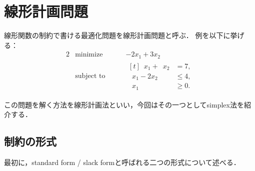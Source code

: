 \documentclass{jsarticle}
\begin{document}
\section{線形計画問題}

線形関数の制約で書ける最適化問題を線形計画問題と呼ぶ．
例を以下に挙げる：
\begin{alignat*}{2}
  & \text{minimize } & & -2x_1 + 3x_2 \\
  & \text{subject to }& \quad & \begin{aligned}[t]
    \phantom{1}x_1 + \phantom{1}x_2 &= 7,\\
    \phantom{1}x_1 - 2x_2 &\le 4,\\
    \phantom{1}x_1 \phantom{{} + 0x_2} &\ge 0.
  \end{aligned}
\end{alignat*}


この問題を解く方法を線形計画法といい，今回はその一つとしてsimplex法を紹介する．

\subsection{制約の形式}
最初に，standard form / slack formと呼ばれる二つの形式について述べる．
\end{document}
